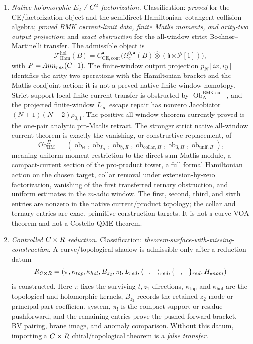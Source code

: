 \begin{enumerate}
  \item \emph{Native holomorphic \(E_2\) / \(C^2\) factorization.}
  Classification: \emph{proved} for the CE/factorization object and the
  semidirect Hamiltonian--cotangent collision algebra;
  \emph{proved BMK current-limit data, finite Matlis moments, and
  arity-two output projection}; and
  \emph{exact obstruction} for the all-window strict
  Bochner--Martinelli transfer.  The admissible object is
  \[
    \mathcal F_{\mathrm{Ham}}^{\mathrm{hol}}(B)
    =
    C^\bullet_{\mathrm{CE},\mathrm{cont}}
    \bigl(\Omega_c^{0,\bullet}(B)\widehat\otimes
    (\mathfrak h\ltimes\mathcal P[1])\bigr),
  \]
  with \(P=Ann_{res}(C\cdot1)\).
  The finite-window output projection \(p_N[ix,iy]\) identifies the
  arity-two operations with the Hamiltonian bracket and the Matlis
  coadjoint action; it is not a proved native finite-window homotopy.
  Strict support-local finite-current transfer is obstructed by
  \(\operatorname{Ob}^{\mathrm{BMK\mbox{-}curr}}_N\), and the projected
  finite-window \(L_\infty\) escape repair has nonzero Jacobiator
  \((N+1)(N+2)\rho_{0,1}\).  The positive all-window theorem currently
  proved is the one-pair analytic pro-Matlis retract.  The stronger
  strict native all-window current theorem is exactly the vanishing, or
  constructive replacement, of
  \[
    \operatorname{Ob}^{\Pi}_{\mathrm{BM}}
    =
    (\operatorname{ob}_{\oplus},
     \operatorname{ob}_{I_\Pi},
     \operatorname{ob}_{\mathfrak h,\Pi},
     \operatorname{ob}_{\mathrm{collar},\Pi},
     \operatorname{ob}_{3,\Pi},
     \operatorname{ob}_{\mathrm{unif},\Pi}),
  \]
  meaning uniform moment restriction to the direct-sum Matlis module,
  a compact-current section of the pro-product tower, a full formal
  Hamiltonian action on the chosen target, collar removal under
  extension-by-zero factorization, vanishing of the first transferred
  ternary obstruction, and uniform estimates in the \(m\)-adic window.
  The first, second, third, and sixth entries are nonzero in the native
  current/product topology; the collar and ternary entries are exact
  primitive construction targets.
  It is not a curve VOA theorem and not a Costello QME theorem.

  \item \emph{Controlled \(C\times R\) reduction.}
  Classification: \emph{theorem-surface-with-missing-construction}.
  A curve/topological shadow is admissible only after a reduction datum
  \[
    R_{C\times R}
    =
    (\pi,\kappa_{top},\kappa_{hol},
     B_{z_2},\pi_!,L_{red},
     \langle-,-\rangle_{red},
     \{-,-\}_{red},H_{anom})
  \]
  is constructed.  Here \(\pi\) fixes the surviving \(t,z_1\)
  directions, \(\kappa_{\mathrm{top}}\) and
  \(\kappa_{\mathrm{hol}}\) are the topological and holomorphic kernels,
  \(B_{z_2}\) records the retained \(z_2\)-mode or principal-part
  coefficient system, \(\pi_!\) is the compact-support or residue
  pushforward, and the remaining entries prove the pushed-forward
  bracket, BV pairing, brane image, and anomaly comparison.  Without
  this datum, importing a \(C\times R\) chiral/topological theorem is a
  \emph{false transfer}.


\end{enumerate}
